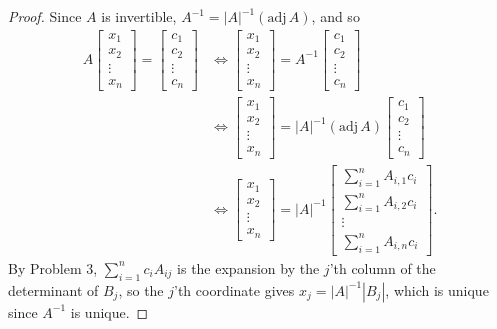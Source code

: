 \begin{proof}
    Since $A$ is invertible, $A^{-1} = |A|^{-1}(\mathrm{adj}\, A)$, and so
    \begin{align*}
        A \begin{bmatrix} x_1 \\ x_2 \\ \vdots \\ x_n \end{bmatrix} = \begin{bmatrix} c_1 \\ c_2 \\ \vdots \\ c_n \end{bmatrix} 
        &\iff  \begin{bmatrix} x_1 \\ x_2 \\ \vdots \\ x_n \end{bmatrix} = A^{-1} \begin{bmatrix} c_1 \\ c_2 \\ \vdots \\ c_n \end{bmatrix} \\
        &\iff \begin{bmatrix} x_1 \\ x_2 \\ \vdots \\ x_n \end{bmatrix} = |A|^{-1}(\mathrm{adj}\, A) \begin{bmatrix} c_1 \\ c_2 \\ \vdots \\ c_n \end{bmatrix} \\
        &\iff \begin{bmatrix} x_1 \\ x_2 \\ \vdots \\ x_n \end{bmatrix} = |A|^{-1}    
        \begin{bmatrix}
        \sum_{i=1}^n A_{i,1} c_i \\
        \sum_{i=1}^n A_{i,2} c_i \\
        \vdots \\
        \sum_{i=1}^n A_{i,n} c_i
    \end{bmatrix}.
    \end{align*}
    By Problem 3, $\sum_{i=1}^n c_i A_{ij}$ is the expansion by the $j$'th column of the determinant
    of $B_j$, so the $j$'th coordinate gives $x_j = |A|^{-1}|B_j|$, which is unique since
    $A^{-1}$ is unique.
\end{proof}


